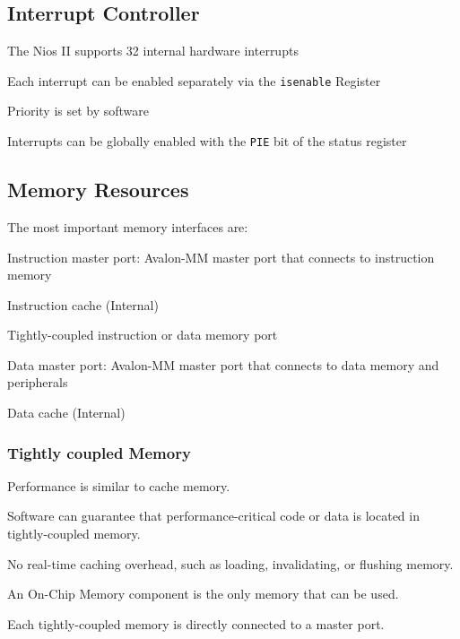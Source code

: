 	\subsection{Interrupt Controller }
		\begin{multicols}{2}
			\begin{compactitem}
				\item The Nios II supports 32 internal hardware interrupts				
				\item Each interrupt can be enabled separately via the \texttt{isenable} Register
				\item Priority is set by software
				\item Interrupts can be globally enabled with the \texttt{PIE} bit of the status register
			\end{compactitem}
		\end{multicols}
	
	\subsection{Memory Resources \weekMaehne{2}}
		The most important memory interfaces are:
		\begin{multicols}{2}
			\begin{compactitem}
				\item Instruction master port: Avalon-MM master port that connects to instruction memory
				\item Instruction cache (Internal)
				\item Tightly-coupled instruction or data memory port
				\item Data master port: Avalon-MM master port that connects to data memory and peripherals
				\item Data cache (Internal)				
			\end{compactitem}
		\end{multicols}
	
		\subsubsection{Tightly coupled Memory \weekPageMaehne{2}{14}}
			\begin{multicols}{2}
				\begin{compactitem}
					\item Performance is similar to cache memory.
					\item Software can guarantee that performance-critical code or data is located in tightly-coupled memory.
					\item No real-time caching overhead, such as loading, invalidating, or flushing memory.
					\item An On-Chip Memory component is the only memory that can be used.
					\item Each tightly-coupled memory is directly connected to a master port.
				\end{compactitem}
			\end{multicols}